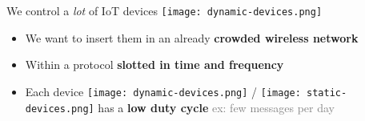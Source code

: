\begin{frameO}[We want]

    We control a \emph{lot} of IoT devices \texttt{[image: dynamic-devices.png]}

    \begin{itemize}
        \item
            We want to insert them in an already \textbf{crowded wireless network}
        \item
            Within a protocol \textbf{slotted in time and frequency}
        \item
            Each device \texttt{[image: dynamic-devices.png]} / \texttt{[image: static-devices.png]} has a \textbf{low duty cycle} \hfill{}
            \textcolor{gray}{ex: few messages per day}
    \end{itemize}

    \pause






\end{frameO}



